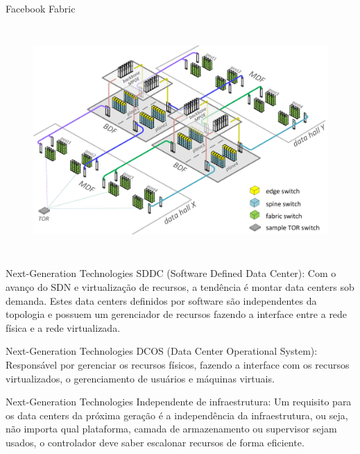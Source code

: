 \documentclass[aspectratio=169]{beamer}
\begin{document}
\begin{frame} {Facebook Fabric}
\begin{columns}
             \begin{figure}[ht]    
                             \includegraphics[scale=0.23]{phisic_fabric.jpg}
                             \label{fig:problems}
                         \end{figure}
            \end{columns}
    \end{frame}

	\begin{frame} {Next-Generation Technologies}
		SDDC (Software Defined Data Center): Com o avanço do SDN e virtualização de recursos, a tendência é montar data centers sob demanda. Estes data centers definidos por software são independentes da topologia e possuem um gerenciador de recursos fazendo a interface entre a rede física e a rede virtualizada.
	\end{frame}

	\begin{frame} {Next-Generation Technologies}
		DCOS (Data Center Operational System): Responsável por gerenciar os recursos físicos, fazendo a interface com os recursos virtualizados, o gerenciamento de usuários e máquinas virtuais.
	\end{frame}

	\begin{frame} {Next-Generation Technologies}
		Independente de infraestrutura: Um requisito para os data centers da próxima geração é a independência da infraestrutura, ou seja, não importa qual plataforma, camada de armazenamento ou supervisor sejam usados, o controlador deve saber escalonar recursos de forma eficiente.
	\end{frame}
\end{document}
